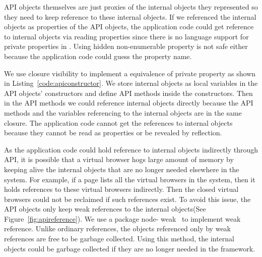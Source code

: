 API objects themselves are just proxies of the internal objects they
represented so they need to keep reference to these internal objects. If we
referenced the internal objects as properties of the API objects, the
application code could get reference to internal objects via reading
properties  since there is no language support for private properties in \js.
Using hidden non-enumerable property is not safe either because the
application code could guess the property name.

We use closure visibility to implement a equivalence of private property as
shown in Listing~\ref{code:apiconstructor}. We store internal objects as local
variables in the API objects' constructors and define API methods inside the
constructors. Then in the API methods we could reference internal objects
directly because the API methods and the variables referencing to the internal
objects are in the same closure. The application code cannot get the
references to internal objects because they cannot be read as properties or be
revealed by reflection.




As the application code could hold reference to internal objects indirectly
through API, it is possible that a virtual browser hogs large amount of memory
by keeping alive the internal objects that are no longer needed elsewhere in
the system.  For example, if a page lists all the virtual browsers in the
system, then it holds references to these virtual browsers indirectly. Then
the closed virtual browsers could not be reclaimed if such references exist.
To avoid this issue, the API objects only keep weak references to the internal
objects(See Figure~\ref{fig:apireference}). We use a \nodejs{} package node-
weak~\cite{nodeweak} to implement weak reference. Unlike ordinary references,
the objects referenced only by weak references are free to be garbage
collected. Using this method, the internal objects could be garbage collected
if they are no longer needed in the framework.


